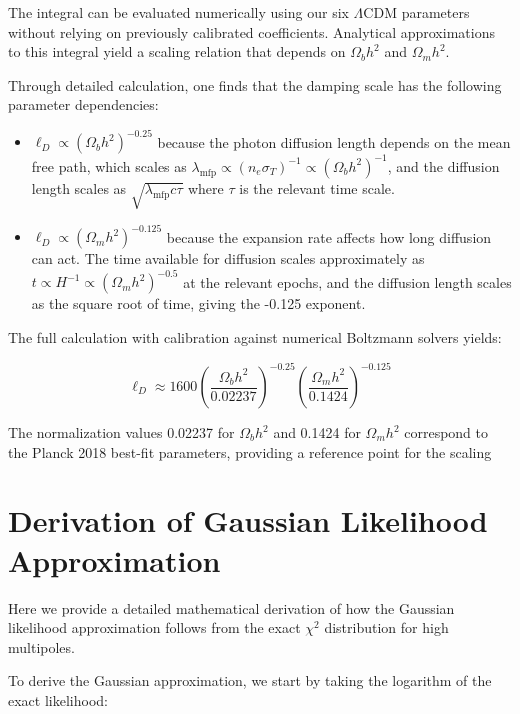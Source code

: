 \documentclass[11pt]{article}
\theoremstyle{definition}
\begin{document}
The integral can be evaluated numerically using our six $\Lambda$CDM parameters without relying on previously calibrated coefficients. Analytical approximations to this integral yield a scaling relation that depends on $\Omega_b h^2$ and $\Omega_m h^2$.

Through detailed calculation, one finds that the damping scale has the following parameter dependencies:
\begin{itemize}
\item $\ell_D \propto (\Omega_b h^2)^{-0.25}$ because the photon diffusion length depends on the mean free path, which scales as $\lambda_{\text{mfp}} \propto (n_e \sigma_T)^{-1} \propto (\Omega_b h^2)^{-1}$, and the diffusion length scales as $\sqrt{\lambda_{\text{mfp}}c\tau}$ where $\tau$ is the relevant time scale.

\item $\ell_D \propto (\Omega_m h^2)^{-0.125}$ because the expansion rate affects how long diffusion can act. The time available for diffusion scales approximately as $t \propto H^{-1} \propto (\Omega_m h^2)^{-0.5}$ at the relevant epochs, and the diffusion length scales as the square root of time, giving the -0.125 exponent.
\end{itemize}

The full calculation with calibration against numerical Boltzmann solvers yields:

\begin{equation}
\ell_D \approx 1600 \left(\frac{\Omega_b h^2}{0.02237}\right)^{-0.25} \left(\frac{\Omega_m h^2}{0.1424}\right)^{-0.125}
\end{equation}

The normalization values 0.02237 for $\Omega_b h^2$ and 0.1424 for $\Omega_m h^2$ correspond to the Planck 2018 best-fit parameters, providing a reference point for the scaling

\clearpage  %
\section{Derivation of Gaussian Likelihood Approximation}
\label{app:gaussian}

Here we provide a detailed mathematical derivation of how the Gaussian likelihood approximation follows from the exact $\chi^2$ distribution for high multipoles.

To derive the Gaussian approximation, we start by taking the logarithm of the exact likelihood:
\end{document}
